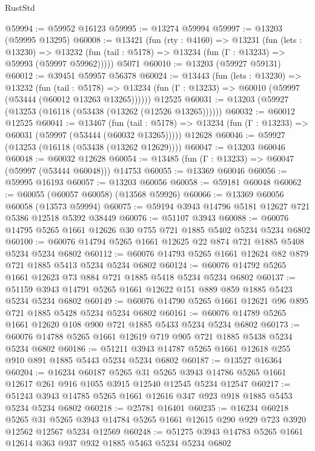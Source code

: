 \begin{lexlean}{RustStd}
\begin{coremodule}
@59994 := @59952 @16123
@59995 := @13274 @59994
@59997 := @13203 (@59995 @13295)
@60008 := @13421
    (fun (rty : @4160) =>
    @13231
      (fun (lets : @13230) =>
      @13232 (fun (tail : @5178) => @13234 (fun (Γ : @13233) => @59993 (@59997 @59962)))))
    @5071
@60010 := @13203 (@59927 @59131)
@60012 := @39451 @59957 @56378
@60024 := @13443
    (fun (lets : @13230) =>
    @13232
      (fun (tail : @5178) =>
      @13234 (fun (Γ : @13233) => @60010 (@59997 (@53444 (@60012 @13263 @13265))))))
    @12525
@60031 := @13203 (@59927 (@13253 (@16118 (@53438 (@13262 (@12526 @13265))))))
@60032 := @60012 @12525
@60041 := @13467
    (fun (tail : @5178) => @13234 (fun (Γ : @13233) => @60031 (@59997 (@53444 (@60032 @13265)))))
    @12628
@60046 := @59927 (@13253 (@16118 (@53438 (@13262 @12629))))
@60047 := @13203 @60046
@60048 := @60032 @12628
@60054 := @13485 (fun (Γ : @13233) => @60047 (@59997 (@53444 @60048))) @14753
@60055 := @13369 @60046
@60056 := @59995 @16193
@60057 := @13203 @60056
@60058 := @59181 @60048
@60062 := @60055 (@60057 @60058) (@13568 @59926)
@60066 := @13369 @60056 @60058 (@13573 @59994)
@60075 := @59194 @3943 @14796 @5181 @12627 @721 @5386 @12518 @5392 @38449
@60076 := @51107 @3943
@60088 := @60076 @14795 @5265 @1661 @12626 @30 @755 @721 @1885 @5402 @5234 @5234 @6802
@60100 := @60076 @14794 @5265 @1661 @12625 @22 @874 @721 @1885 @5408 @5234 @5234 @6802
@60112 := @60076 @14793 @5265 @1661 @12624 @82 @879 @721 @1885 @5413 @5234 @5234 @6802
@60124 := @60076 @14792 @5265 @1661 @12623 @73 @884 @721 @1885 @5418 @5234 @5234 @6802
@60137 := @51159 @3943 @14791 @5265 @1661 @12622 @151 @889 @859 @1885 @5423 @5234 @5234 @6802
@60149 := @60076 @14790 @5265 @1661 @12621 @96 @895 @721 @1885 @5428 @5234 @5234 @6802
@60161 := @60076 @14789 @5265 @1661 @12620 @108 @900 @721 @1885 @5433 @5234 @5234 @6802
@60173 := @60076 @14788 @5265 @1661 @12619 @719 @905 @721 @1885 @5438 @5234 @5234 @6802
@60186 := @51211 @3943 @14787 @5265 @1661 @12618 @255 @910 @891 @1885 @5443 @5234 @5234 @6802
@60187 := @13527 @16364
@60204 := @16234
    @60187
    @5265
    @31
    @5265
    @3943
    @14786
    @5265
    @1661
    @12617
    @261
    @916
    @1055
    @3915
    @12540
    @12545
    @5234
    @12547
@60217 := @51243 @3943 @14785 @5265 @1661 @12616 @347 @923 @918 @1885 @5453 @5234 @5234 @6802
@60218 := @25781 @16401
@60235 := @16234
    @60218
    @5265
    @31
    @5265
    @3943
    @14784
    @5265
    @1661
    @12615
    @290
    @929
    @723
    @3920
    @12562
    @12567
    @5234
    @12569
@60248 := @51275 @3943 @14783 @5265 @1661 @12614 @363 @937 @932 @1885 @5463 @5234 @5234 @6802

\end{coremodule}
\end{lexlean}
